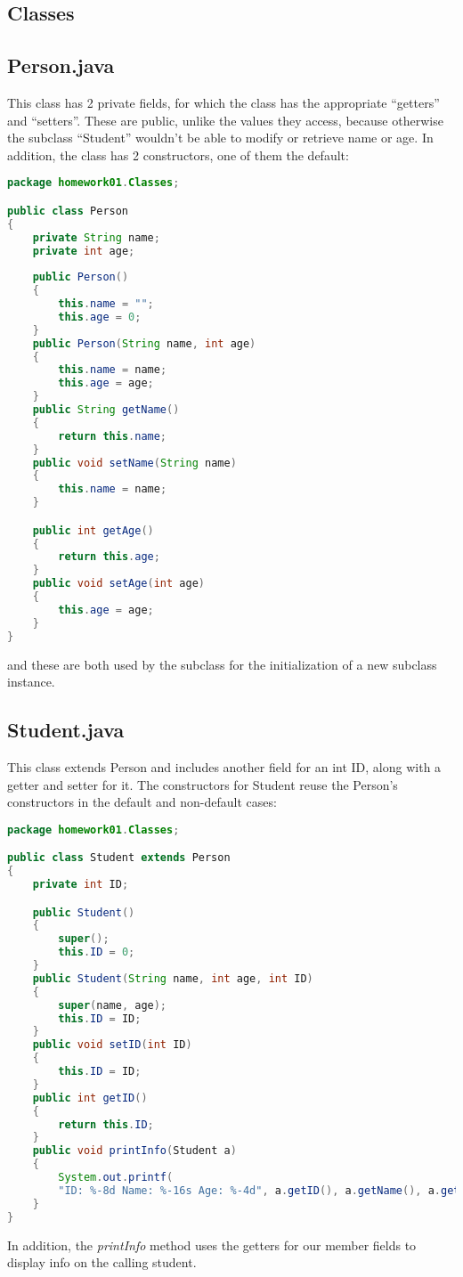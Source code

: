 \documentclass{article}
\begin{document}
\begin{large}
\section*{Classes}
\subsection*{Person.java}
This class has 2 private fields, for which the class has the appropriate ``getters'' and ``setters''. These are public, unlike the values they access, because otherwise the subclass ``Student'' wouldn't be able to modify or retrieve name or age. In addition, the class has 2 constructors, one of them the default:
\begin{lstlisting}[language=Java]
package homework01.Classes;

public class Person
{
	private String name;
	private int age;
	
	public Person()
	{
		this.name = "";
		this.age = 0;
	}
	public Person(String name, int age)
	{
		this.name = name;
		this.age = age;
	}
	public String getName()
	{
		return this.name;
	}
	public void setName(String name)
	{	
		this.name = name;
	}

	public int getAge()
	{
		return this.age;
	}
	public void setAge(int age)
	{	
		this.age = age;
	}
}

\end{lstlisting}
and these are both used by the subclass for the initialization of a new subclass instance.
\subsection*{Student.java}
This class extends Person and includes another field for an int ID, along with a getter and setter for it. The constructors for Student reuse the Person's constructors in the default and non-default cases:
\begin{lstlisting}[language=Java]
package homework01.Classes;

public class Student extends Person
{
	private int ID;

	public Student()
	{
		super();
		this.ID = 0;
	}
	public Student(String name, int age, int ID)
	{
		super(name, age);
		this.ID = ID;
	}
	public void setID(int ID)
	{
		this.ID = ID;
	}
	public int getID()
	{
		return this.ID;
	}
	public void printInfo(Student a)
	{
		System.out.printf(
		"ID: %-8d Name: %-16s Age: %-4d", a.getID(), a.getName(), a.getAge());
	}	
}

\end{lstlisting}
In addition, the \textit{printInfo} method uses the getters for our member fields to display info on the calling student.

\end{large}
\end{document}
